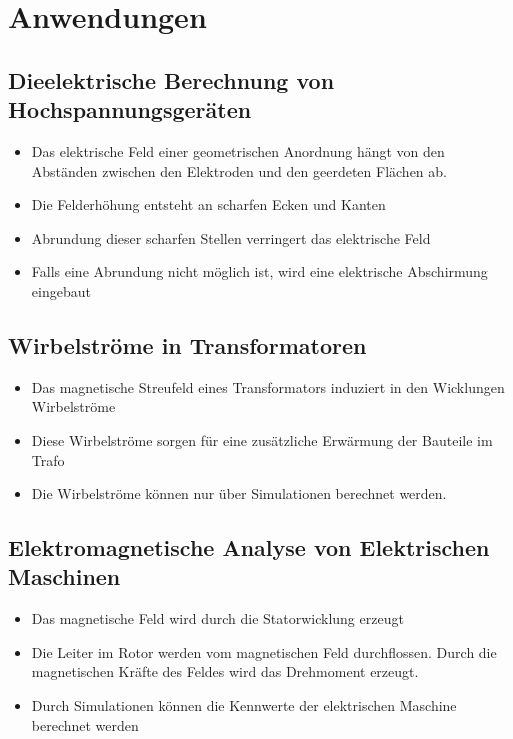 \section{Anwendungen}
\subsection{Dieelektrische Berechnung von Hochspannungsgeräten}
\begin{itemize}
	\item Das elektrische Feld einer geometrischen Anordnung hängt von den Abständen zwischen den Elektroden und den geerdeten Flächen ab.
	\item Die Felderhöhung entsteht an scharfen Ecken und Kanten
	\item Abrundung dieser scharfen Stellen verringert das elektrische Feld
	\item Falls eine Abrundung nicht möglich ist, wird eine elektrische Abschirmung eingebaut
\end{itemize}
\subsection{Wirbelströme in Transformatoren}
\begin{itemize}
	\item Das magnetische Streufeld eines Transformators induziert in den Wicklungen Wirbelströme
	\item Diese Wirbelströme sorgen für eine zusätzliche Erwärmung der Bauteile im Trafo
	\item Die Wirbelströme können nur über Simulationen berechnet werden. 
\end{itemize}
\subsection{Elektromagnetische Analyse von Elektrischen Maschinen}
\begin{itemize}
	\item Das magnetische Feld wird durch die Statorwicklung erzeugt
	\item Die Leiter im Rotor werden vom magnetischen Feld durchflossen. Durch die magnetischen Kräfte des Feldes wird das Drehmoment erzeugt. 
	\item Durch Simulationen können die Kennwerte der elektrischen Maschine berechnet werden
\end{itemize}
